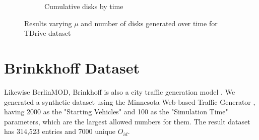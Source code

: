 {\begin{figure}[h!]
\begin{subfigure}[t]{0.48\textwidth}
        \caption{Cumulative disks by time}
        \label{fig:tdrive_disks}
    \end{subfigure}
    \caption{Results varying $\mu$ and number of disks generated over time for TDrive dataset}
    \label{fig:tdrive_results2}
\end{figure}

\section{Brinkkhoff Dataset}
\label{sec:brinkhoff}
Likewise BerlinMOD, Brinkhoff is also a city traffic generation model \citep{brinkhoffpaper}. We generated a synthetic
dataset using the Minnesota Web-based Traffic Generator \citep{mntg}, having 2000 as the "Starting Vehicles" and 100 as
the "Simulation Time" parameters, which are the largest allowed numbers for them. The result dataset has 314,523 entries
and 7000 unique $O_{id}$.

}
